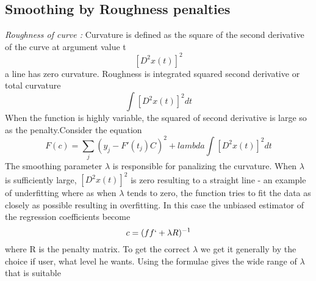 \documentclass{article}
\begin{document}
\subsection{Smoothing by Roughness penalties} %
\textit{Roughness of curve :} Curvature is defined as the square of the second derivative of the curve at argument value t\[ [D^2x(t)]^2 \] a line has zero curvature. Roughness is integrated squared second derivative or total curvature \[ \int [D^2x(t)]^2 dt\] When the function is highly variable, the squared of second derivative is large so as the penalty.Consider the equation
\[ F(c) = \sum_j(y_j - F'(t_j)C)^2  + lambda \int [D^2x(t)]^2 dt \]
The smoothing parameter \(\lambda \) is responsible for panalizing the curvature. When \(\lambda \) is sufficiently large, \( [D^2x(t)]^2 \) is zero resulting to a straight line - an example of underfitting where as when \(\lambda \) tends to zero, the function tries to fit the data as closely as possible resulting in overfitting. In this case the unbiased estimator of the regression coefficients become \[ c = (ff`+ \lambda R)^{-1} \] where R is the penalty matrix. To get the correct \(\lambda \) we get it generally by the choice if user, what level he wants. Using the formulae gives the wide range of \( \lambda \) that is suitable



\end{document}
